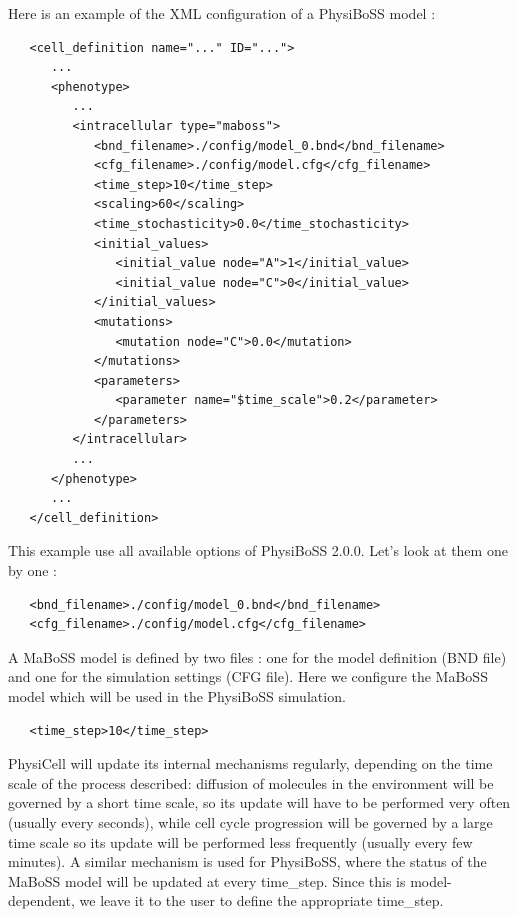 \documentclass[12pt]{article}
\newcommand{\Version}{2.0.0}
\begin{document}
Here is an example of the XML configuration of a PhysiBoSS model : 
\begin{verbatim}
   <cell_definition name="..." ID="...">
      ...
      <phenotype>
         ...
         <intracellular type="maboss">
            <bnd_filename>./config/model_0.bnd</bnd_filename>
            <cfg_filename>./config/model.cfg</cfg_filename>
            <time_step>10</time_step>
            <scaling>60</scaling>
            <time_stochasticity>0.0</time_stochasticity>
            <initial_values>
               <initial_value node="A">1</initial_value>
               <initial_value node="C">0</initial_value>
            </initial_values>
            <mutations>
               <mutation node="C">0.0</mutation>
            </mutations>
            <parameters>
               <parameter name="$time_scale">0.2</parameter>
            </parameters>	
         </intracellular>
         ...
      </phenotype>
      ...
   </cell_definition>
\end{verbatim}

This example use all available options of PhysiBoSS \Version. Let's look at them one by one : 

\begin{verbatim}
   <bnd_filename>./config/model_0.bnd</bnd_filename>
   <cfg_filename>./config/model.cfg</cfg_filename>
\end{verbatim}

A MaBoSS model is defined by two files : one for the model definition (BND file) and one for the simulation settings (CFG file). Here we configure the MaBoSS model which will be used in the PhysiBoSS simulation. 

\begin{verbatim}
   <time_step>10</time_step>
\end{verbatim}

PhysiCell will update its internal mechanisms regularly, depending on the time scale of the process described: diffusion of molecules in the environment will be governed by a short time scale, so its update will have to be performed very often (usually every seconds), while cell cycle progression will be governed by a large time scale so its update will be performed less frequently (usually every few minutes). A similar mechanism is used for PhysiBoSS, where the status of the MaBoSS model will be updated at every time\_step. Since this is model-dependent, we leave it to the user to define the appropriate time\_step.
\end{document}
